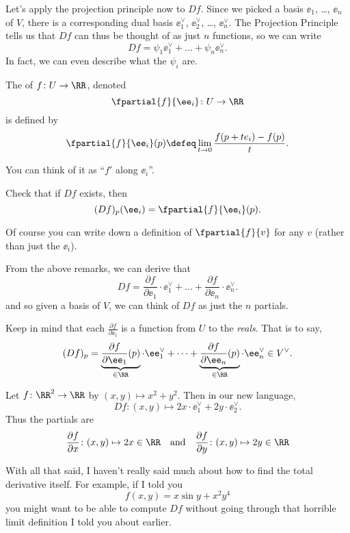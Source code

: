 Let's apply the projection principle now to $Df$.
Since we picked a basis $\ee_1$, \dots, $\ee_n$ of $V$,
there is a corresponding dual basis
$\ee_1^\vee$, $\ee_2^\vee$, \dots, $\ee_n^\vee$.
The Projection Principle tells us that $Df$ can thus be thought of as just $n$ functions, so we can write
\[ Df = \psi_1 \ee_1^\vee + \dots + \psi_n \ee_n^\vee.  \]
In fact, we can even describe what the $\psi_i$ are.
\begin{definition}
	The  of $f \colon U \to \RR$, denoted
	\[ \fpartial{f}{\ee_i} \colon U \to \RR \]
	is defined by
	\[
		\fpartial{f}{\ee_i} (p)
		\defeq \lim_{t \to 0} \frac{f(p + te_i) - f(p)}{t}.
	\]
\end{definition}
You can think of it as ``$f'$ along $\ee_i$''.
\begin{ques}
	Check that if $Df$ exists, then \[ (Df)_p(\ee_i) = \fpartial{f}{\ee_i}(p). \]
\end{ques}
\begin{remark}
	Of course you can write down a definition of $\fpartial{f}{v}$
	for any $v$ (rather than just the $\ee_i$).
\end{remark}

From the above remarks, we can derive that
\[
	\boxed{
	Df =
	\frac{\partial f}{\partial \ee_1} \cdot \ee_1^\vee
	+ \dots +
	\frac{\partial f}{\partial \ee_n} \cdot \ee_n^\vee .
	}
\]
and so given a basis of $V$, we can think of $Df$ as just
the $n$ partials.
\begin{remark}
Keep in mind that each $\frac{\partial f}{\partial \ee_i}$ is a function from $U$ to the \emph{reals}.
That is to say,
\[
	(Df)_p =
	\underbrace{\frac{\partial f}{\partial \ee_1}(p)}_{\in \RR} \cdot \ee_1^\vee
	+ \dots +
	\underbrace{\frac{\partial f}{\partial \ee_n}(p)}_{\in \RR} \cdot \ee_n^\vee
	\in V^\vee.
\]
\end{remark}


\begin{example}[Partial derivatives of $f(x,y) = x^2+y^2$]
	Let $f \colon \RR^2 \to \RR$ by $(x,y) \mapsto x^2+y^2$.
	Then in our new language,
	\[ Df \colon (x,y) \mapsto 2x \cdot \ee_1^\vee + 2y \cdot \ee_2^\vee. \]
	Thus the partials are
	\[
		\frac{\partial f}{\partial x} \colon (x,y) \mapsto 2x \in \RR
		\quad\text{and}\quad
		\frac{\partial f}{\partial y} \colon (x,y) \mapsto 2y \in \RR
	\]
\end{example}

With all that said, I haven't really said much about how to
find the total derivative itself.
For example, if I told you
\[ f(x,y) = x \sin y + x^2y^4 \]
you might want to be able to compute $Df$ without going through
that horrible limit definition I told you about earlier.

